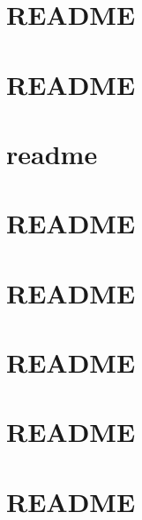 \documentclass[twoside]{book}
\newcommand{\+}{\discretionary{\mbox{\scriptsize$\hookleftarrow$}}{}{}}
\begin{document}
\chapter{R\+E\+A\+D\+ME}
\label{md_smacc_client_library_ros_publisher_client_README}
\hypertarget{md_smacc_client_library_ros_publisher_client_README}{}

\chapter{R\+E\+A\+D\+ME}
\label{md_smacc_client_library_ros_timer_client_README}
\hypertarget{md_smacc_client_library_ros_timer_client_README}{}

\chapter{readme}
\label{md_smacc_diagnostics_readme}
\hypertarget{md_smacc_diagnostics_readme}{}

\chapter{R\+E\+A\+D\+ME}
\label{md_smacc_diagnostics_sm_test_README}
\hypertarget{md_smacc_diagnostics_sm_test_README}{}

\chapter{R\+E\+A\+D\+ME}
\label{md_smacc_diagnostics_sm_test1_README}
\hypertarget{md_smacc_diagnostics_sm_test1_README}{}

\chapter{R\+E\+A\+D\+ME}
\label{md_smacc_diagnostics_sm_test2_README}
\hypertarget{md_smacc_diagnostics_sm_test2_README}{}

\chapter{R\+E\+A\+D\+ME}
\label{md_smacc_diagnostics_sm_test3_README}
\hypertarget{md_smacc_diagnostics_sm_test3_README}{}

\chapter{R\+E\+A\+D\+ME}
\label{md_smacc_sm_reference_library_sm_atomic_README}
\hypertarget{md_smacc_sm_reference_library_sm_atomic_README}{}

\end{document}
